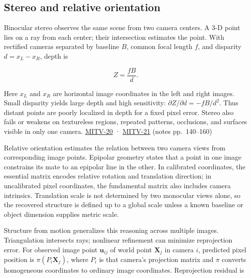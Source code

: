 \subsection{Stereo and relative orientation}\label{04-visual-computing-ii-ch032-stereo-and-relative-orientation}

\hypertarget{04-visual-computing-ii-ch032-stereo-and-relative-orientation}{}

Binocular stereo observes the same scene from two camera centers. A 3-D point lies on a ray from each center; their intersection estimates the point. With rectified cameras separated by baseline \(B\), common focal length \(f\), and disparity \(d=x_L-x_R\), depth is

\[
Z=\frac{fB}{d}.
\]

Here \(x_L\) and \(x_R\) are horizontal image coordinates in the left and right images. Small disparity yields large depth and high sensitivity: \(\partial Z/\partial d=-fB/d^2\). Thus distant points are poorly localized in depth for a fixed pixel error. Stereo also fails or weakens on textureless regions, repeated patterns, occlusions, and surfaces visible in only one camera. \hyperref[04-visual-computing-ii-ch036-mitv-20---space-of-rotations-regular-tessellations-critical-surfaces-binocular-stereo]{MITV-20} · \hyperref[04-visual-computing-ii-ch036-mitv-21---relative-orientation-binocular-stereo-structure-quadrics-calibration-reprojection]{MITV-21} (notes pp.~140--160)

Relative orientation estimates the relation between two camera views from corresponding image points. Epipolar geometry states that a point in one image constrains its mate to an epipolar line in the other. In calibrated coordinates, the essential matrix encodes relative rotation and translation direction; in uncalibrated pixel coordinates, the fundamental matrix also includes camera intrinsics. Translation scale is not determined by two monocular views alone, so the recovered structure is defined up to a global scale unless a known baseline or object dimension supplies metric scale.

Structure from motion generalizes this reasoning across multiple images. Triangulation intersects rays; nonlinear refinement can minimize reprojection error. For observed image point \(\mathbf{u}_{ij}\) of world point \(\mathbf{X}_j\) in camera \(i\), predicted pixel position is \(\pi(P_i\mathbf{X}_j)\), where \(P_i\) is that camera's projection matrix and \(\pi\) converts homogeneous coordinates to ordinary image coordinates. Reprojection residual is

